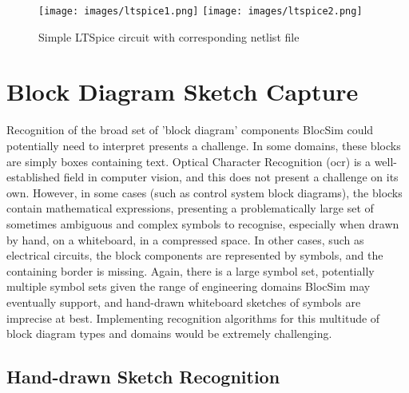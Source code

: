 

\begin{figure}[ht!]
\centering
\texttt{[image: images/ltspice1.png]}
\texttt{[image: images/ltspice2.png]}
\caption{Simple LTSpice circuit with corresponding netlist file \cite{ltspice}}
\label{im:ltspice}
\end{figure}

\clearpage

\section{Block Diagram Sketch Capture}

Recognition of the broad set of 'block diagram' components BlocSim could potentially need to interpret presents a challenge. In some domains, these blocks are simply boxes containing text. Optical Character Recognition (\gls{ocr}) is a well-established field in computer vision, and this does not present a challenge on its own. However, in some cases (such as control system block diagrams), the blocks contain mathematical expressions, presenting a problematically large set of sometimes ambiguous and complex symbols to recognise, especially when drawn by hand, on a whiteboard, in a compressed space. In other cases, such as electrical circuits, the block components are represented by symbols, and the containing border is missing. Again, there is a large symbol set, potentially multiple symbol sets given the range of engineering domains BlocSim may eventually support, and hand-drawn whiteboard sketches of symbols are imprecise at best. Implementing recognition algorithms for this multitude of block diagram types and domains would be extremely challenging.
\\


\subsection{Hand-drawn Sketch Recognition}

